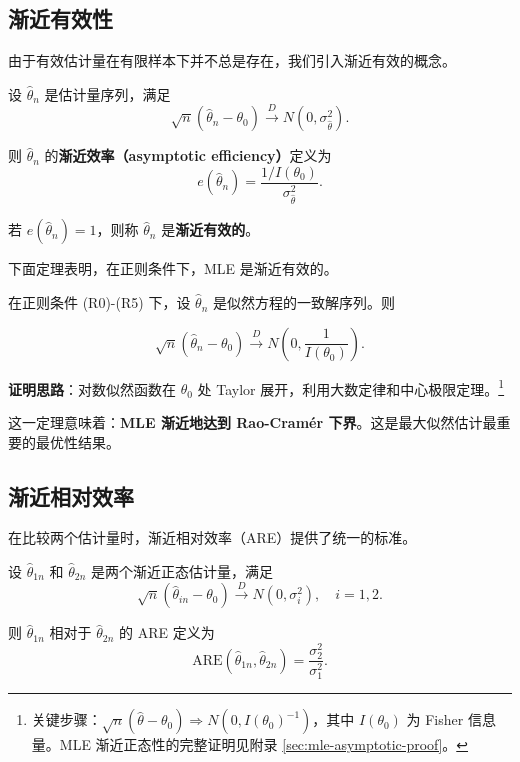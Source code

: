 \subsection{渐近有效性}

由于有效估计量在有限样本下并不总是存在，我们引入渐近有效的概念。

\begin{definition}[渐近有效性]\label{def:asymptotic-efficiency}
设 $\widehat{\theta}_n$ 是估计量序列，满足
\[
\sqrt{n}(\widehat{\theta}_n - \theta_0) \xrightarrow{D} N(0, \sigma^2_{\widehat{\theta}}).
\]

则 $\widehat{\theta}_n$ 的\textbf{渐近效率（asymptotic efficiency）}定义为
\[
e(\widehat{\theta}_n) = \frac{1/I(\theta_0)}{\sigma^2_{\widehat{\theta}}}.
\label{eq:asymptotic-efficiency}
\]

若 $e(\widehat{\theta}_n) = 1$，则称 $\widehat{\theta}_n$ 是\textbf{渐近有效的}。
\end{definition}

下面定理表明，在正则条件下，MLE 是渐近有效的。

\begin{theorem}\label{th:mle-asymptotic}
在正则条件 (R0)-(R5) 下，设 $\widehat{\theta}_n$ 是似然方程的一致解序列。则

\[
\sqrt{n}(\widehat{\theta}_n - \theta_0) \xrightarrow{D} N\left(0, \frac{1}{I(\theta_0)}\right).
\label{eq:mle-asymptotic-normal}
\]
\end{theorem}

\textbf{证明思路}：对数似然函数在 $\theta_0$ 处 Taylor 展开，利用大数定律和中心极限定理。\footnote{关键步骤：$\sqrt{n}(\widehat{\theta}-\theta_0) \Rightarrow N(0, I(\theta_0)^{-1})$，其中 $I(\theta_0)$ 为 Fisher 信息量。MLE 渐近正态性的完整证明见附录 \cref{sec:mle-asymptotic-proof}。}

这一定理意味着：\textbf{MLE 渐近地达到 Rao-Cramér 下界}。这是最大似然估计最重要的最优性结果。

\subsection{渐近相对效率}

在比较两个估计量时，渐近相对效率（ARE）提供了统一的标准。

\begin{definition}[渐近相对效率]\label{def:are}
设 $\widehat{\theta}_{1n}$ 和 $\widehat{\theta}_{2n}$ 是两个渐近正态估计量，满足
\[
\sqrt{n}(\widehat{\theta}_{in} - \theta_0) \xrightarrow{D} N(0, \sigma_i^2), \quad i=1,2.
\]

则 $\widehat{\theta}_{1n}$ 相对于 $\widehat{\theta}_{2n}$ 的 ARE 定义为
\[
\text{ARE}(\widehat{\theta}_{1n}, \widehat{\theta}_{2n}) = \frac{\sigma_2^2}{\sigma_1^2}.
\label{eq:are-definition}
\]
\end{definition}

